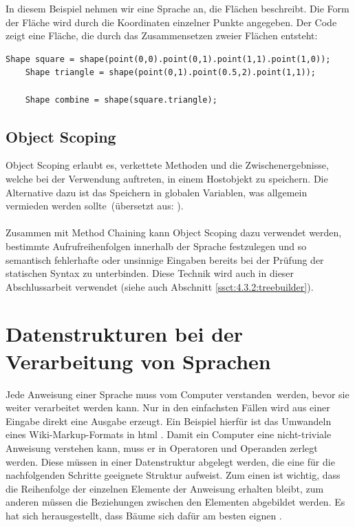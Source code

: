 In diesem Beispiel nehmen wir eine Sprache an, die Flächen beschreibt. Die Form der Fläche wird durch die Koordinaten einzelner Punkte angegeben. Der Code zeigt eine Fläche, die durch das Zusammensetzen zweier Flächen entsteht:

\begin{lstlisting}[caption=beispielhafte Verwendung von Method Nesting]
	Shape square = shape(point(0,0).point(0,1).point(1,1).point(1,0));
	Shape triangle = shape(point(0,1).point(0.5,2).point(1,1));
	
	Shape combine = shape(square.triangle);
\end{lstlisting}

\subsection{Object Scoping}\label{ssct:4.1.3:scoping}
Object Scoping erlaubt es, verkettete Methoden und die Zwischenergebnisse, welche bei der Verwendung auftreten, in einem Hostobjekt zu speichern. Die Alternative dazu ist das Speichern in globalen Variablen, was \glqq allgemein vermieden werden sollte\grqq~(übersetzt aus: \cite{book:fowlerDSL}).
\\ \\
Zusammen mit Method Chaining kann Object Scoping dazu verwendet werden, bestimmte Aufrufreihenfolgen innerhalb der Sprache festzulegen und so semantisch fehlerhafte oder unsinnige Eingaben bereits bei der Prüfung der statischen Syntax zu unterbinden. Diese Technik wird auch in dieser Abschlussarbeit verwendet (siehe auch Abschnitt \ref{ssct:4.3.2:treebuilder}).

\section{Datenstrukturen bei der Verarbeitung von Sprachen}\label{sct:4.2:datenstrukturen}
Jede Anweisung einer Sprache muss vom Computer \glqq verstanden\grqq~werden, bevor sie weiter verarbeitet werden kann. Nur in den einfachsten Fällen wird aus einer Eingabe direkt eine Ausgabe erzeugt. Ein Beispiel hierfür ist das Umwandeln eines Wiki-Markup-Formats in html \cite{book:parrLang}.
Damit ein Computer eine nicht-triviale Anweisung verstehen kann, muss er in Operatoren und Operanden zerlegt werden. Diese müssen in einer Datenstruktur abgelegt werden, die eine für die nachfolgenden Schritte geeignete Struktur aufweist. Zum einen ist wichtig, dass die Reihenfolge der einzelnen Elemente der Anweisung erhalten bleibt, zum anderen müssen die Beziehungen zwischen den Elementen abgebildet werden. Es hat sich herausgestellt, dass Bäume sich dafür am besten eignen \cite{book:parrLang}.

